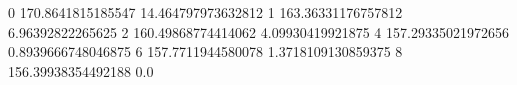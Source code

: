 0 170.8641815185547 14.464797973632812
1 163.36331176757812 6.96392822265625
2 160.49868774414062 4.09930419921875
4 157.29335021972656 0.8939666748046875
6 157.7711944580078 1.3718109130859375
8 156.39938354492188 0.0
